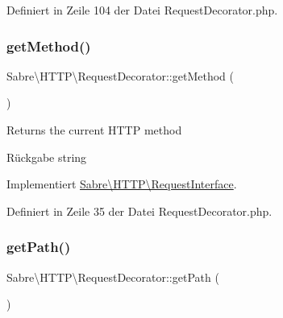 Definiert in Zeile 104 der Datei Request\+Decorator.\+php.

\mbox{\label{class_sabre_1_1_h_t_t_p_1_1_request_decorator_a696811a053a65fafc920dbdfde0bd545}} 
\subsubsection{\texorpdfstring{get\+Method()}{getMethod()}}
{\footnotesize\ttfamily Sabre\textbackslash{}\+H\+T\+T\+P\textbackslash{}\+Request\+Decorator\+::get\+Method (\begin{DoxyParamCaption}{ }\end{DoxyParamCaption})}

Returns the current H\+T\+TP method

\begin{DoxyReturn}{Rückgabe}
string 
\end{DoxyReturn}


Implementiert \mbox{\hyperlink{interface_sabre_1_1_h_t_t_p_1_1_request_interface_a261109b4898971242fccc2097a880131}{Sabre\textbackslash{}\+H\+T\+T\+P\textbackslash{}\+Request\+Interface}}.



Definiert in Zeile 35 der Datei Request\+Decorator.\+php.

\mbox{\label{class_sabre_1_1_h_t_t_p_1_1_request_decorator_a4349070826f60655b60ea18a61dc8c3c}} 
\subsubsection{\texorpdfstring{get\+Path()}{getPath()}}
{\footnotesize\ttfamily Sabre\textbackslash{}\+H\+T\+T\+P\textbackslash{}\+Request\+Decorator\+::get\+Path (\begin{DoxyParamCaption}{ }\end{DoxyParamCaption})}

